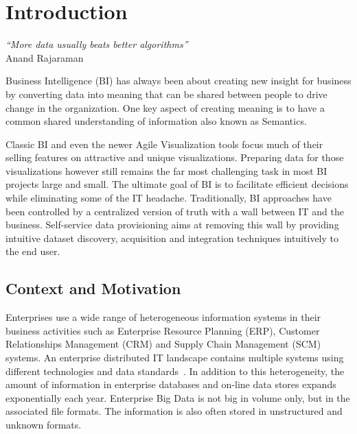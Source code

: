 \chapter{Introduction}  \label{chapter:introduction}
\graphicspath{{introduction/figures/}}

\begin{flushright}
\textit{``More data usually beats better algorithms''}\\
 Anand Rajaraman

\end{flushright}

Business Intelligence (BI) has always been about creating new insight for business by converting data into meaning that can be shared between people to drive change in the organization. One key aspect of creating meaning is to have a common shared understanding of information also known as Semantics.

Classic BI and even the newer Agile Visualization tools focus much of their selling features on attractive and unique visualizations. Preparing data for those visualizations however still remains the far most challenging task in most BI projects large and small. The ultimate goal of BI is to facilitate efficient decisions while eliminating some of the IT headache. Traditionally, BI approaches have been controlled by a centralized version of truth with a wall between IT and the business. Self-service data provisioning aims at removing this wall by providing intuitive dataset discovery, acquisition and integration techniques intuitively to the end user.

\section{Context and Motivation} \label{section:motivation}

Enterprises use a wide range of heterogeneous information systems in their business activities such as Enterprise Resource Planning (ERP), Customer Relationships Management (CRM) and Supply Chain Management (SCM) systems. An enterprise distributed IT landscape contains multiple systems using different technologies and data standards~\cite{Mihindukulasooriya:COLD:13}. In addition to this heterogeneity, the amount of information in enterprise databases and on-line data stores expands exponentially each year. Enterprise Big Data is not big in volume only, but in the associated file formats. The information is also often stored in unstructured and unknown formats.

